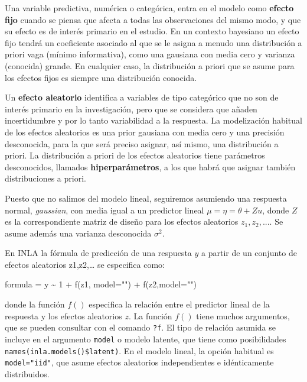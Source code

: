 \documentclass[
]{book}
\newenvironment{Shaded}{\begin{snugshade}}{\end{snugshade}}
\newcommand{\AttributeTok}[1]{\textcolor[rgb]{0.77,0.63,0.00}{#1}}
\newcommand{\DecValTok}[1]{\textcolor[rgb]{0.00,0.00,0.81}{#1}}
\newcommand{\FunctionTok}[1]{\textcolor[rgb]{0.00,0.00,0.00}{#1}}
\newcommand{\NormalTok}[1]{#1}
\newcommand{\OtherTok}[1]{\textcolor[rgb]{0.56,0.35,0.01}{#1}}
\newcommand{\SpecialCharTok}[1]{\textcolor[rgb]{0.00,0.00,0.00}{#1}}
\newcommand{\StringTok}[1]{\textcolor[rgb]{0.31,0.60,0.02}{#1}}
\begin{document}
Una variable predictiva, numérica o categórica, entra en el modelo como \textbf{efecto fijo} cuando se piensa que afecta a todas las observaciones del mismo modo, y que su efecto es de interés primario en el estudio.
En un contexto bayesiano un efecto fijo tendrá un coeficiente asociado al que se le asigna a menudo una distribución a priori vaga (mínimo informativa), como una gausiana con media cero y varianza (conocida) grande. En cualquier caso, la distribución a priori que se asume para los efectos fijos es siempre una distribución conocida.

Un \textbf{efecto aleatorio} identifica a variables de tipo categórico que no son de interés primario en la investigación, pero que se considera que añaden incertidumbre y por lo tanto variabilidad a la respuesta. La modelización habitual de los efectos aleatorios es una prior gausiana con media cero y una precisión desconocida, para la que será preciso asignar, así mismo, una distribución a priori. La distribución a priori de los efectos aleatorios tiene parámetros desconocidos, llamados \textbf{hiperparámetros}, a los que habrá que asignar también distribuciones a priori.

Puesto que no salimos del modelo lineal, seguiremos asumiendo una respuesta normal, \emph{gaussian}, con media igual a un predictor lineal \(\mu=\eta=\theta+ Z u\), donde \(Z\) es la correspondiente matriz de diseño para los efectos aleatorios \(z_1, z_2,...\). Se asume además una varianza desconocida \(\sigma^2\).

En INLA la fórmula de predicción de una respuesta \(y\) a partir de un conjunto de efectos aleatorios z1,z2,\ldots{} se especifica como:

\begin{Shaded}
\begin{Highlighting}[]
\NormalTok{formula }\OtherTok{=}\NormalTok{ y }\SpecialCharTok{\textasciitilde{}} \DecValTok{1}  \SpecialCharTok{+} \FunctionTok{f}\NormalTok{(z1, }\AttributeTok{model=}\StringTok{""}\NormalTok{) }\SpecialCharTok{+} \FunctionTok{f}\NormalTok{(z2,}\AttributeTok{model=}\StringTok{""}\NormalTok{) }
\end{Highlighting}
\end{Shaded}

donde la función \(f()\) especifica la relación entre el predictor lineal de la respuesta y los efectos aleatorios \(z\). La función \(f()\) tiene muchos argumentos, que se pueden consultar con el comando \texttt{?f}. El tipo de relación asumida se incluye en el argumento \texttt{model} o modelo latente, que tiene como posibilidades \texttt{names(inla.models()\$latent)}. En el modelo lineal, la opción habitual es \texttt{model="iid"}, que asume efectos aleatorios independientes e idénticamente distribuidos.
\end{document}
